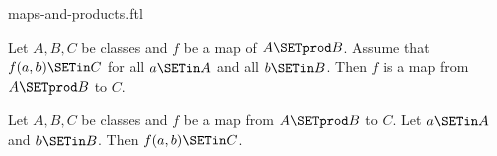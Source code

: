 \documentclass{naproche-library}
\begin{document}
\begin{smodule}[title=Maps and Products]{maps-and-products.ftl}

\begin{proposition}[forthel,id=FOUNDATIONS_06_2754759509409792]
  Let $A, B, C$ be classes and $f$ be a map of $A \SETprod B$.
  Assume that $f(a,b) \SETin C$ for all $a \SETin A$ and all $b \SETin B$.
  Then $f$ is a map from $A \SETprod B$ to $C$.
\end{proposition}

\begin{proposition}[forthel,id=FOUNDATIONS_06_2304295212941312]
  Let $A, B, C$ be classes and $f$ be a map from $A \SETprod B$ to $C$.
  Let $a \SETin A$ and $b \SETin B$.
  Then $f(a,b) \SETin C$.
\end{proposition}
\end{smodule}
\end{document}
